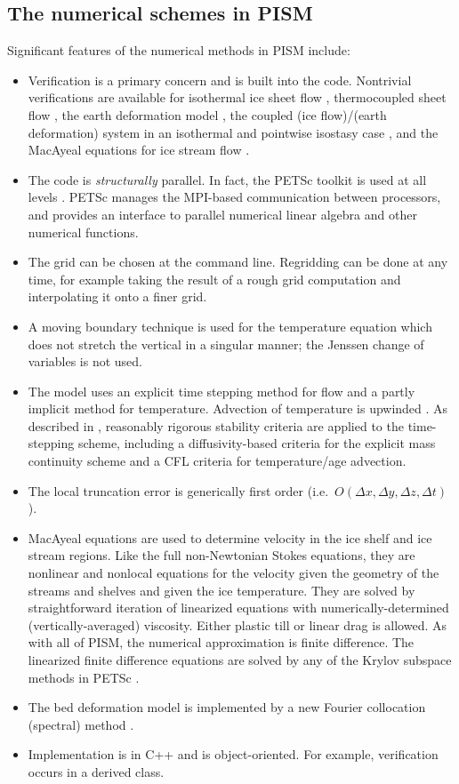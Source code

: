 \documentclass[11pt,final]{amsart}
\begin{document}
\subsection{The numerical schemes in PISM}  Significant features of the numerical methods in PISM include:\begin{itemize}
\item Verification \cite{Roache} is a primary concern and is built into the code.  Nontrivial verifications are available for isothermal ice sheet flow \cite{BLKCB}, thermocoupled sheet flow \cite{BB,BBL}, the earth deformation model \cite{BLKfastearth}, the coupled (ice flow)/(earth deformation) system in an isothermal and pointwise isostasy  case \cite{BLKfastearth}, and the MacAyeal equations for ice stream flow \cite{SchoofStream,BrownPresentation}.
\item The code is \emph{structurally} parallel.  In fact, the PETSc toolkit is used at all levels \cite{petsc-user-ref}.  PETSc manages the MPI-based communication between processors, and provides an interface to parallel numerical linear algebra and other numerical functions.
\item The grid can be chosen at the command line.  Regridding can be done at any time, for example taking the result of a rough grid computation and interpolating it onto a finer grid.
\item A moving boundary technique is used for the temperature equation which does not stretch the vertical in a singular manner; the Jenssen \cite{Jenssen} change of variables is not used.
\item The model uses an explicit time stepping method for flow and a partly implicit method for temperature.  Advection of temperature is upwinded \cite{MortonMayers}.  As described  in  \cite{BBL}, reasonably rigorous stability criteria are applied to the time-stepping scheme, including a diffusivity-based criteria for the explicit mass continuity scheme and a CFL criteria \cite{MortonMayers} for temperature/age advection.
\item The local truncation error is generically first order (i.e.~$O(\Delta x,\Delta y,\Delta z,\Delta t)$).
\item MacAyeal equations \cite{MacAyeal,SchoofStream} are used to determine velocity in the ice shelf and ice stream regions.  Like the full non-Newtonian Stokes equations, they are nonlinear and nonlocal equations for the velocity given the geometry of the streams and shelves and given the ice temperature.  They are solved by straightforward iteration of linearized equations with numerically-determined (vertically-averaged) viscosity.  Either plastic till or linear drag is allowed.  As with all of PISM, the numerical approximation is finite difference.  The linearized finite difference equations are solved by any of the Krylov subspace methods in PETSc \cite{BrownPresentation,petsc-user-ref}.
\item The bed deformation model is implemented by a new Fourier collocation (spectral) method \cite{BLKfastearth}.
\item Implementation is in C++ and is object-oriented.  For example, verification occurs in a derived class.
\end{itemize}
\end{document}
